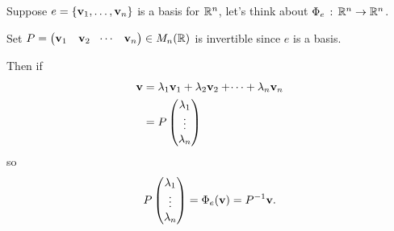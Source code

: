 \documentclass[10pt, a4paper]{article}
\begin{document}
Suppose $e = \{\mathbf{v}_1, \dotsc, \mathbf{v}_n\}$ is a basis for $\mathbb{R} ^ n$,
let's think about $\Phi_e\,:\,\mathbb{R} ^ n \rightarrow \mathbb{R} ^ n$.

Set $P = \begin{pmatrix}
    \mathbf{v}_1 & \mathbf{v}_2 & \dotsi & \mathbf{v}_n
\end{pmatrix} \in M_n(\mathbb{R})$
is invertible since $e$ is a basis.

Then if
\begin{align*}
    \mathbf{v} &= \lambda_1\mathbf{v}_1 + \lambda_2\mathbf{v}_2 + \dotsi + \lambda_n\mathbf{v}_n \\
    &= P\begin{pmatrix}
        \lambda_1 \\ \vdots \\ \lambda_n
    \end{pmatrix}
\end{align*}
so
\[
P\begin{pmatrix}
    \lambda_1 \\ \vdots \\ \lambda_n
\end{pmatrix} = \Phi_e(\mathbf{v}) = P ^ {-1}\mathbf{v}.
\]
\end{document}
